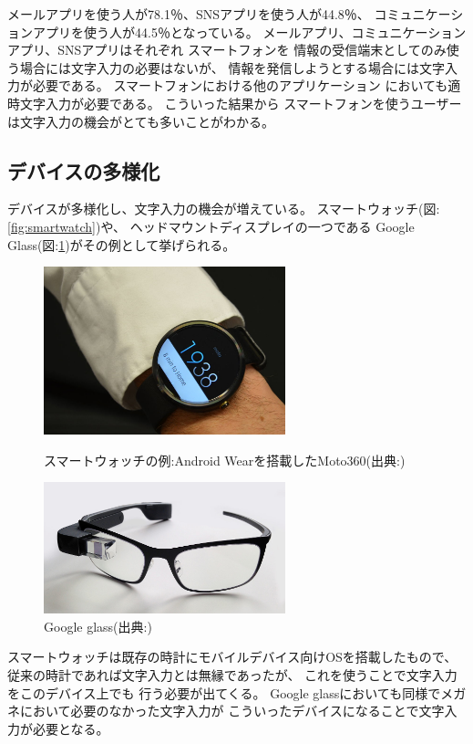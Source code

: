 メールアプリを使う人が78.1％、SNSアプリを使う人が44.8％、
コミュニケーションアプリを使う人が44.5％となっている。
メールアプリ、コミュニケーションアプリ、SNSアプリはそれぞれ
スマートフォンを
情報の受信端末としてのみ使う場合には文字入力の必要はないが、
情報を発信しようとする場合には文字入力が必要である。
スマートフォンにおける他のアプリケーション
においても適時文字入力が必要である。
こういった結果から
スマートフォンを使うユーザーは文字入力の機会がとても多いことがわかる。

\subsection{デバイスの多様化}
デバイスが多様化し、文字入力の機会が増えている。
スマートウォッチ(図:\ref{fig:smartwatch})や、
ヘッドマウントディスプレイの一つである
Google Glass(図:\ref{fig:googleglass})がその例として挙げられる。
\begin{figure}[htbp]
  \begin{minipage}{0.5\hsize}
    \begin{center}
      \includegraphics[width=70mm,bb=0 0 246 171]{images/smartwatch.png}
    \end{center}
    \caption{スマートウォッチの例:Android Wearを搭載したMoto360(出典:\cite{smartwatch})}
    \label{fig:smartwatch}
  \end{minipage}
  \begin{minipage}{0.5\hsize}
    \begin{center}
      \includegraphics[width=70mm,bb=0 0 1280 697]{images/googleglass.png}
    \end{center}
    \caption{Google glass(出典:\cite{googleglass})}
    \label{fig:googleglass}
  \end{minipage}
\end{figure}
スマートウォッチは既存の時計にモバイルデバイス向けOSを搭載したもので、
従来の時計であれば文字入力とは無縁であったが、
これを使うことで文字入力をこのデバイス上でも
行う必要が出てくる。
Google glassにおいても同様でメガネにおいて必要のなかった文字入力が
こういったデバイスになることで文字入力が必要となる。

